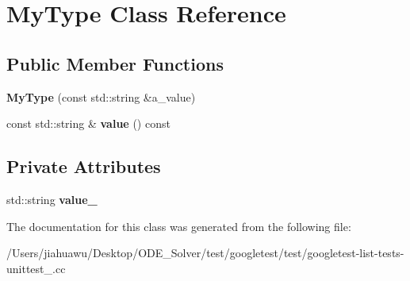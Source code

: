 \hypertarget{class_my_type}{}\section{My\+Type Class Reference}
\label{class_my_type}
\subsection*{Public Member Functions}
\begin{DoxyCompactItemize}
\item 
\mbox{\label{class_my_type_a74d6f29a06e298321a6e5f0b91b020e7}} 
{\bfseries My\+Type} (const std\+::string \&a\+\_\+value)
\item 
\mbox{\label{class_my_type_a04eaace57f0ecd8ee8898defbdee31b4}} 
const std\+::string \& {\bfseries value} () const
\end{DoxyCompactItemize}
\subsection*{Private Attributes}
\begin{DoxyCompactItemize}
\item 
\mbox{\label{class_my_type_ae294bc35031fef7015a1b135deeedd22}} 
std\+::string {\bfseries value\+\_\+}
\end{DoxyCompactItemize}


The documentation for this class was generated from the following file\+:\begin{DoxyCompactItemize}
\item 
/\+Users/jiahuawu/\+Desktop/\+O\+D\+E\+\_\+\+Solver/test/googletest/test/googletest-\/list-\/tests-\/unittest\+\_\+.\+cc\end{DoxyCompactItemize}
